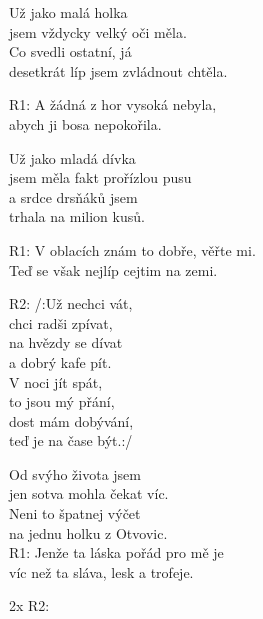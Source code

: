 
\thispagestyle{empty}

\vspace{-5px}
\ve
{}Už jako malá holka\\
jsem vždycky velký oči měla.\\
Co svedli ostatní, já\\
desetkrát líp jsem zvládnout chtěla.

\vspace{-5px}
\re{}R1:
A žádná z hor vysoká nebyla,\\
abych ji bosa nepokořila.

\vspace{-5px}
\ve
Už jako mladá dívka\\
jsem měla fakt prořízlou pusu\\
a srdce drsňáků jsem\\
trhala na milion kusů.

\vspace{-5px}
\re{}R1:
V oblacích znám to dobře, věřte mi.\\
Teď se však nejlíp cejtim na zemi.

\vspace{-5px}
\re{}R2:
/:Už nechci vát,\\
chci radši zpívat,\\
na hvězdy se dívat\\
a dobrý kafe pít.\\
V noci jít spát,\\
to jsou mý přání,\\
dost mám dobývání,\\
teď je na čase být.:/ 

\vspace{-5px}
\ve
Od svýho života jsem\\
jen sotva mohla čekat víc.\\
Neni to špatnej výčet\\
na jednu holku z Otvovic.\\

\vspace{-5px}
\re{}R1:
Jenže ta láska pořád pro mě je\\
víc než ta sláva, lesk a trofeje.

\re{}2x R2:


\esong
